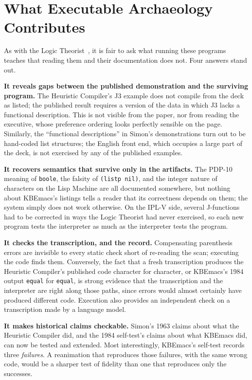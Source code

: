 \documentclass[11pt]{article}
\begin{document}
\section{What Executable Archaeology Contributes}
\label{sec:contribution}

As with the Logic Theorist~\cite{moewsshrager2026}, it is fair to ask
what running these programs teaches that reading them and their
documentation does not. Four answers stand out.

\textbf{It reveals gaps between the published demonstration and the
surviving program.} The Heuristic Compiler's J3 example does not
compile from the deck as listed; the published result requires a
version of the data in which J3 lacks a functional description. This
is not visible from the paper, nor from reading the executive, whose
preference ordering looks perfectly sensible on the page. Similarly,
the ``functional descriptions'' in Simon's demonstrations turn out to
be hand-coded list structures; the English front end, which occupies a
large part of the deck, is not exercised by any of the published
examples.

\textbf{It recovers semantics that survive only in the artifacts.} The
PDP-10 meaning of \texttt{boole}, the falsity of \texttt{(listp nil)},
and the integer nature of characters on the Lisp Machine are all
documented somewhere, but nothing about KBEmacs's listings tells a
reader that its correctness depends on them; the system simply does not
work otherwise. On the IPL-V side, several J-functions had to be
corrected in ways the Logic Theorist had never exercised, so each new
program tests the interpreter as much as the interpreter tests the
program.

\textbf{It checks the transcription, and the record.} Compensating
parenthesis errors are invisible to every static check short of
re-reading the scan; executing the code finds them. Conversely, the
fact that a fresh transcription produces the Heuristic Compiler's
published code character for character, or KBEmacs's 1984 output
\texttt{equal} for \texttt{equal}, is strong evidence that the
transcription and the interpreter are right along those paths, since
errors would almost certainly have produced different code. Execution
also provides an independent check on a transcription made by a
language model.

\textbf{It makes historical claims checkable.} Simon's 1963 claims
about what the Heuristic Compiler did, and the 1984 self-test's claims
about what KBEmacs did, can now be tested and extended. Most
interestingly, KBEmacs's self-test records three \emph{failures}. A
reanimation that reproduces those failures, with the same wrong code,
would be a sharper test of fidelity than one that reproduces only the
successes.
\end{document}

